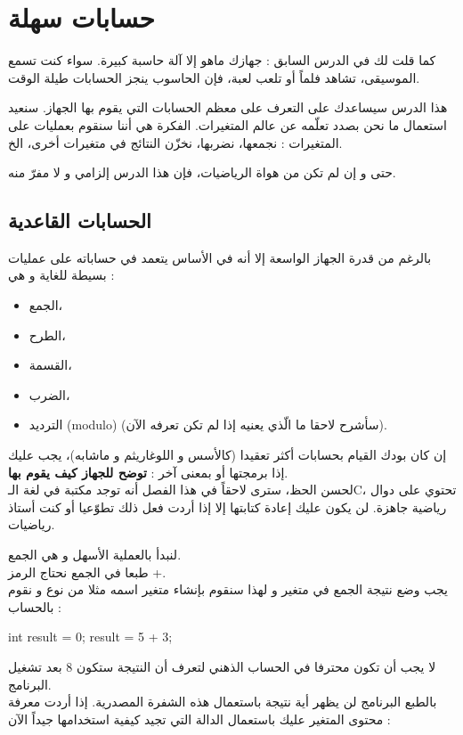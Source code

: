 \chapter{حسابات سهلة}

كما قلت لك في الدرس السابق : جهازك ماهو إلا آلة حاسبة كبيرة. سواء كنت تسمع الموسيقى، تشاهد فلماً أو تلعب لعبة، فإن الحاسوب ينجز الحسابات طيلة الوقت.

هذا الدرس سيساعدك على التعرف على معظم الحسابات التي يقوم بها الجهاز. سنعيد استعمال ما نحن بصدد تعلّمه عن عالم المتغيرات. الفكرة هي أننا سنقوم بعمليات على المتغيرات : نجمعها، نضربها، نخزّن النتائج في متغيرات أخرى، الخ.

حتى و إن لم تكن من هواة الرياضيات، فإن هذا الدرس إلزامي و لا مفرّ منه.

\section{الحسابات القاعدية}

بالرغم من قدرة الجهاز الواسعة إلا أنه في الأساس يتعمد في حساباته على عمليات بسيطة للغاية و هي :

\begin{itemize}
  \item الجمع،
  \item الطرح،
  \item القسمة،
  \item الضرب،
  \item الترديد
(\textenglish{modulo})
(سأشرح لاحقا ما الّذي يعنيه إذا لم تكن تعرفه الآن).
\end{itemize}

إن كان بودك القيام بحسابات أكثر تعقيدا (كالأسس و اللوغاريثم و ماشابه)، يجب عليك إذا برمجتها أو بمعنى آخر :
\textbf{توضح للجهاز كيف يقوم بها}.\\
لحسن الحظ، سترى لاحقاً في هذا الفصل أنه توجد مكتبة في لغة الـ\textenglish{C}،
تحتوي على دوال رياضية جاهزة. لن يكون عليك إعادة كتابتها إلا إذا أردت فعل ذلك تطوّعيا أو كنت أستاذ رياضيات.

لنبدأ بالعملية الأسهل و هي الجمع.\\
طبعا في الجمع نحتاج الرمز +.\\
يجب وضع نتيجة الجمع في متغير و لهذا سنقوم بإنشاء متغير اسمه مثلا
من نوع
و نقوم بالحساب :

\begin{Csource}
  int result = 0;
  result = 5 + 3;
\end{Csource}

لا يجب أن تكون محترفا في الحساب الذهني لتعرف أن النتيجة ستكون 8 بعد تشغيل البرنامج.\\
بالطبع البرنامج لن يظهر أية نتيجة باستعمال هذه الشفرة المصدرية. إذا أردت معرفة محتوى المتغير
عليك باستعمال الدالة
التي تجيد كيفية استخدامها جيداً الآن :

